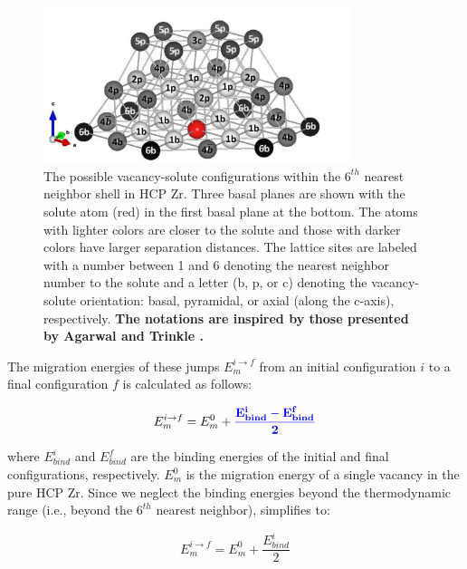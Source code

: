 \documentclass[preprint,12pt]{elsarticle}
\providecommand{\DIFadd}[1]{{\bf #1}} %
\providecommand{\DIFdel}[1]{} %
\providecommand{\DIFaddbegin}{\protect\color{blue}} %
\providecommand{\DIFaddend}{\protect\color{black}} %
\providecommand{\DIFdelbegin}{\protect\color{red}} %
\providecommand{\DIFdelend}{\protect\color{black}} %
\providecommand{\DIFaddFL}[1]{\DIFadd{#1}} %
\providecommand{\DIFaddbeginFL}{} %
\providecommand{\DIFaddendFL}{} %
\providecommand{\DIFdelbeginFL}{} %
\providecommand{\DIFdelendFL}{} %
\newcommand{\DIFscaledelfig}{0.5}
\newlength{\DIFdelgraphicswidth} %
\newlength{\DIFdelgraphicsheight} %
\newcommand{\DIFaddincludegraphics}[2][]{{\color{blue}\fbox{\DIFOincludegraphics[#1]{#2}}}} %
\newcommand{\DIFdelincludegraphics}[2][]{%
\sbox{\DIFdelgraphicsbox}{\DIFOincludegraphics[#1]{#2}}%
\settoboxwidth{\DIFdelgraphicswidth}{\DIFdelgraphicsbox} %
\settoboxtotalheight{\DIFdelgraphicsheight}{\DIFdelgraphicsbox} %
\scalebox{\DIFscaledelfig}{%
\parbox[b]{\DIFdelgraphicswidth}{\usebox{\DIFdelgraphicsbox}\\[-\baselineskip] \rule{\DIFdelgraphicswidth}{0em}}\llap{\resizebox{\DIFdelgraphicswidth}{\DIFdelgraphicsheight}{%
\setlength{\unitlength}{\DIFdelgraphicswidth}%
\begin{picture}(1,1)%
\thicklines\linethickness{2pt} %
{\color[rgb]{1,0,0}\put(0,0){\framebox(1,1){}}}%
{\color[rgb]{1,0,0}\put(0,0){\line( 1,1){1}}}%
{\color[rgb]{1,0,0}\put(0,1){\line(1,-1){1}}}%
\end{picture}%
}\hspace*{3pt}}} %
} %
\DeclareRobustCommand{\DIFaddbegin}{\DIFOaddbegin \let\includegraphics\DIFaddincludegraphics} %
\DeclareRobustCommand{\DIFaddend}{\DIFOaddend \let\includegraphics\DIFOincludegraphics} %
\DeclareRobustCommand{\DIFdelbegin}{\DIFOdelbegin \let\includegraphics\DIFdelincludegraphics} %
\DeclareRobustCommand{\DIFdelend}{\DIFOaddend \let\includegraphics\DIFOincludegraphics} %
\DeclareRobustCommand{\DIFaddbeginFL}{\DIFOaddbeginFL \let\includegraphics\DIFaddincludegraphics} %
\DeclareRobustCommand{\DIFaddendFL}{\DIFOaddendFL \let\includegraphics\DIFOincludegraphics} %
\DeclareRobustCommand{\DIFdelbeginFL}{\DIFOdelbeginFL \let\includegraphics\DIFdelincludegraphics} %
\DeclareRobustCommand{\DIFdelendFL}{\DIFOaddendFL \let\includegraphics\DIFOincludegraphics} %
\begin{document}
\begin{figure}[h!]
    \centering \DIFdelbeginFL %
\DIFdelendFL \DIFaddbeginFL \includegraphics[width=0.8\textwidth]{1_configurations_labelled.jpg}
    \DIFaddendFL \caption{The possible vacancy-solute configurations within the $6^{th}$ nearest neighbor shell in HCP Zr. Three basal planes are shown with the solute atom (red) in the first basal plane at the bottom. The atoms with lighter colors are closer to the solute and those with darker colors have larger separation distances. The lattice sites are labeled with a number between 1 and 6 denoting the nearest neighbor number to the solute and a letter (b, p, or c) denoting the vacancy-solute orientation: basal, pyramidal, or axial (along the c-axis), respectively. \DIFaddbeginFL \DIFaddFL{The notations are inspired by those presented by Agarwal and Trinkle \cite{agarwal_exact_2017}.}\DIFaddendFL }
    \label{fig:configurations}
\end{figure}

The migration energies of these jumps $ E_m^{i\rightarrow f}$ from an initial configuration $i$ to a final configuration $f$ is calculated as follows:

\begin{equation}
\label{eq_KRA}
    E_m^{i\rightarrow f} = E_m^0 + \DIFdelbegin \DIFdel{\frac{E_{bind}^i + E_{bind}^f}{2}
}\DIFdelend \DIFaddbegin \DIFadd{\frac{E_{bind}^i - E_{bind}^f}{2}
}\DIFaddend \end{equation}

\noindent where $E_{bind}^i$ and $E_{bind}^f$ are the binding energies of the initial and final configurations, respectively. $E_m^0$ is the migration energy of a single vacancy in the pure HCP Zr. Since we neglect the binding energies beyond the thermodynamic range (i.e., beyond the $6^{th}$ nearest neighbor),  simplifies to:

\begin{equation}
      E_m^{i\rightarrow f} = E_m^0 + \frac{E_{bind}^i}{2}  
\end{equation}
\end{document}
